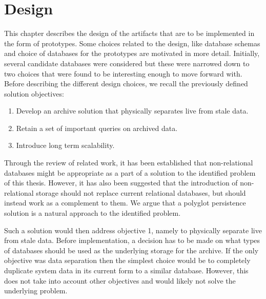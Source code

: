 \chapter{Design}
\label{chap:design}


This chapter describes the design of the artifacts that are to be implemented in the form of prototypes. Some choices related to the design, like database schemas and choice of databases for the prototypes are motivated in more detail. Initially, several candidate databases were considered but these were narrowed down to two choices that were found to be interesting enough to move forward with. Before describing the different design choices, we recall the previously defined solution objectives:
\begin{enumerate}
\item Develop an archive solution that physically separates live from stale data.
\item Retain a set of important queries on archived data.
\item Introduce long term scalability.
\end{enumerate}

Through the review of related work, it has been established that non-relational databases might be appropriate as a part of a solution to the identified problem of this thesis. However, it has also been suggested \cite{NoSQLSurvey} that the introduction of non-relational storage should not replace current relational databases, but should instead work as a complement to them. We argue that a polyglot persistence solution is a natural approach to the identified problem. 

Such a solution would then address objective 1, namely to physically separate live from stale data. Before implementation, a decision has to be made on what types of databases should be used as the underlying storage for the archive. If the only objective was data separation then the simplest choice would be to completely duplicate system data in its current form to a similar database. However, this does not take into account other objectives and would likely not solve the underlying problem. 


